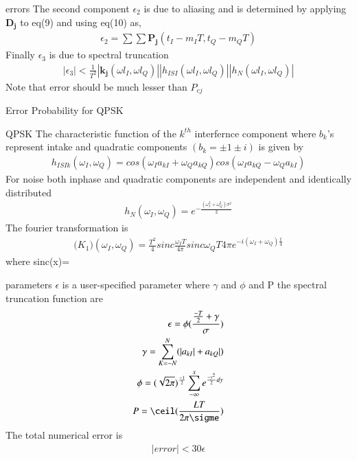 \documentclass{beamer}
\renewcommand{\vec}[1]{\mathbf{#1}}
\begin{document}
\begin{frame}{}
    \begin{block}{errors}
    The second component $\epsilon_2$ is due to aliasing and is determined by applying $\vec{D_j}$ to eq(9) and using eq(10) as,
     \begin{align}
     \epsilon_2=\sum{}{} \sum{}{} \vec{P_j}(t_I-m_IT,t_Q-m_QT)
     \end{align}
     Finally $\epsilon_3$ is due to spectral truncation 
     \begin{align}
         |{\epsilon_3}|<\frac{1}{T^2}|{\vec{k_j}(\omega l_I,\omega l_Q)}||{h_{ISI}(\omega l_I,\omega l_Q)}||{h_N(\omega l_I,\omega l_Q)}|
     \end{align}
     Note that error should be much lesser than $P_{cj}$
    \end{block}
\end{frame}
\begin{frame}{Error Probability for QPSK}
\begin{block}{QPSK}
    The characteristic function of the $k^{th}$ interfernce component where $b_k$'s represent intake and quadratic components $(b_k=\pm1\pm i)$ is given by
    \begin{align}
        h_{ISIk}(\omega_I,\omega_Q)=cos(\omega_Ia_{kI}+\omega_Qa_{kQ})cos(\omega_Ia_{kQ}-\omega_Qa_{kI})
    \end{align}
    For noise both inphase and quadratic components are independent and identically distributed
    \begin{align}
        h_N(\omega_I,\omega_Q)=e^{-\frac{(\omega_I^2+\omega_Q^2)\sigma^2}{2}}
    \end{align}
    The fourier transformation is
    \begin{align}
        \vec(K_{1})(\omega_I,\omega_Q)=\frac{T^2}{4}sinc\frac{\omega_IT}{4\pi}sinc{\omega_QT}{4\pi}e^{-i(\omega_I+\omega_Q)\frac{t}{4}}    
    \end{align}
    where sinc(x)=    
\end{block}
\end{frame}

\begin{frame}{}
    \begin{block}{parameters}
        $\epsilon$ is a user-specified parameter where $\gamma$ and $\phi$ and P the spectral truncation function are 
        \begin{align}
            \epsilon=\phi(\frac{\frac{-T}{2}+\gamma}{\sigma})\\
            \gamma=\sum_{K=-N}^{N}(|a_{kI}|+a_{kQ}|)\\
            \phi=(\sqrt{2\pi})^{\frac{-1}{2}}\sum_{-\infty}^{x}e^{\frac{-y^2}{2}dy}\\
            P=\ceil(\frac{LT}{2\pi\sigme})
        \end{align}
   The total numerical error is 
        \begin{align}
            |error|<30\epsilon
        \end{align}
    \end{block}
\end{frame}
\end{document}
